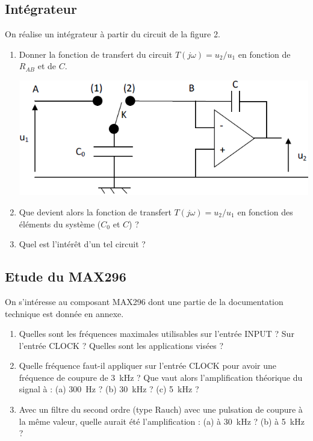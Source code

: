 \documentclass[a4paper,french]{paper}
\begin{document}
{\subsection*{Intégrateur}

On réalise un intégrateur à partir du circuit de la figure 2.

\begin{enumerate}
	\item Donner la fonction de transfert du circuit $T(j\omega) = u_2/u_1$ en fonction de $R_{AB}$ et de $C$.

\begin{center}
	\includegraphics{images/capa_comm_integrateur.png}
\end{center}

	\item Que devient alors la fonction de transfert $T(j\omega{}) = u_2/u_1$ en fonction des éléments du système ($C_0$ et $C$) ?
	\item Quel est l'intérêt d'un tel circuit ?
\end{enumerate}

\subsection*{Etude du MAX296}

On s'intéresse au composant MAX296 dont une partie de la documentation technique est donnée en annexe.

\begin{enumerate}
	\item Quelles sont les fréquences maximales utilisables sur l'entrée \textsc{INPUT} ? Sur l'entrée \textsc{CLOCK} ? Quelles sont les applications visées ?
	\item Quelle fréquence faut-il appliquer sur l'entrée \textsc{CLOCK} pour avoir une fréquence de coupure de 3~kHz ? Que vaut alors l'amplification théorique du signal à : (a) 300~Hz ? (b) 30~kHz ? (c) 5~kHz ?
	\item Avec un filtre du second ordre (type Rauch) avec une pulsation de coupure à la même valeur, quelle aurait été l'amplification : (a) à 30~kHz ? (b) à 5~kHz ?	
	
\end{enumerate}

}



\end{document}
